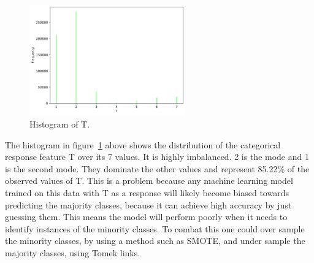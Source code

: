 \documentclass[11pt]{report}
\begin{document}
\begin{figure}[H]
    \centering
    \includegraphics[width=0.6\textwidth]{images/T_histplot.pdf}
    \caption{Histogram of T.}
    \label{fig:t_histplot}
\end{figure}

The histogram in figure~\ref{fig:t_histplot} above shows the distribution of the categorical response feature T over its 7 values. It is highly imbalanced. 2 is the mode and 1 is the second mode. They dominate the other values and represent 85.22\% of the observed values of T. This is a problem because any machine learning model trained on this data with T as a response will likely become biased towards predicting the majority classes, because it can achieve high accuracy by just guessing them. This means the model will perform poorly when it needs to identify instances of the minority classes. To combat this one could over sample the minority classes, by using a method such as SMOTE, and under sample the majority classes, using Tomek links.
\end{document}
